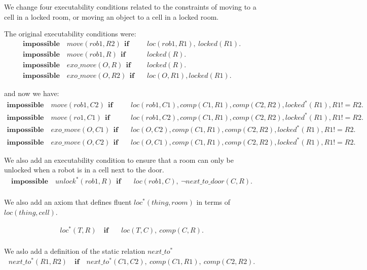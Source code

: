 \documentclass[11pt, oneside]{article}
\begin{document}
We change four executability conditions related to the constraints of moving to a cell in a locked room, or moving an object to a cell in a locked room.

 The original executability conditions were:
 \begin{align*}
   \mathbf{impossible}\quad move(rob1,R2)~~\mathbf{if}&\quad loc(rob1,R1),\ locked(R1). \\
  \mathbf{impossible}\quad move(rob1,R)~~\mathbf{if}&\quad locked(R). \\
  \mathbf{impossible}\quad exo\_move(O,R)~~\mathbf{if}&\quad locked(R).\\
  \mathbf{impossible}\quad exo\_move(O,R2)~~\mathbf{if}&\quad loc(O,R1), locked(R1).
\end{align*}

and now we have:
\begin{align*}
   \mathbf{impossible}\quad move(rob1,C2)~~\mathbf{if}&\quad loc(rob1,C1), comp(C1,R1), comp(C2,R2), locked^*(R1), R1 != R2. \\ 
  \mathbf{impossible}\quad move(ro1,C1)~~\mathbf{if}&\quad loc(rob1,C2), comp(C1,R1), comp(C2,R2), locked^*(R1), R1 != R2. \\
  \mathbf{impossible}\quad exo\_move(O,C1)~~\mathbf{if}&\quad loc(O, C2), comp(C1, R1), comp(C2, R2), locked^*(R1), R1 != R2.\\
  \mathbf{impossible}\quad exo\_move(O,C2)~~\mathbf{if}&\quad loc(O,C1), comp(C1, R1), comp(C2, R2), locked^*(R1), R1 != R2.
\end{align*}

We also add an executability condition to ensure that a room can only be unlocked when a robot is in a cell next to the door.
\begin{align*}
  \mathbf{impossible}\quad unlock^*(rob1, R)~~\mathbf{if}&\quad loc(rob1, C),~\neg next\_to\_door(C, R).\\
\end{align*}

We also add an axiom that defines fluent $loc^*(thing, room)$ in terms of $loc(thing, cell)$. 

\begin{align*}
loc^*(T,R)\quad \mathbf{if}&\quad loc(T,C),~comp(C,R).\\
\end{align*}

We aslo add a definition of the static relation $next\_to^*$
\begin{align*}
next\_to^*(R1,R2)\quad \mathbf{if}~&next\_to^*(C1,C2),~comp(C1,R1),~comp(C2,R2).\\
\end{align*}
\end{document}
